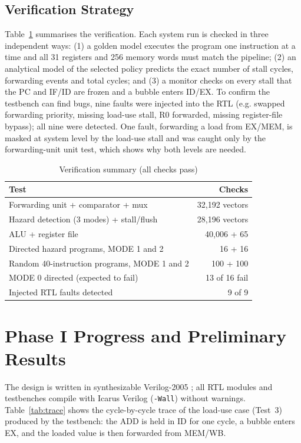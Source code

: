 \documentclass[conference]{IEEEtran}
\begin{document}
\subsection{Verification Strategy}
Table~\ref{tab:verif} summarises the verification. Each system run is checked in three independent ways: (1) a golden model executes the program one instruction at a time and all 31 registers and 256 memory words must match the pipeline; (2) an analytical model of the selected policy predicts the exact number of stall cycles, forwarding events and total cycles; and (3) a monitor checks on every stall that the PC and IF/ID are frozen and a bubble enters ID/EX. To confirm the testbench can find bugs, nine faults were injected into the RTL (e.g. swapped forwarding priority, missing load-use stall, R0 forwarded, missing register-file bypass); all nine were detected. One fault, forwarding a load from EX/MEM, is masked at system level by the load-use stall and was caught only by the forwarding-unit unit test, which shows why both levels are needed.

\begin{table}[t]
\caption{Verification summary (all checks pass)}
\label{tab:verif}
\centering
\begin{tabular}{@{}lr@{}}
\toprule
Test & Checks \\
\midrule
Forwarding unit + comparator + mux & 32{,}192 vectors \\
Hazard detection (3 modes) + stall/flush & 28{,}196 vectors \\
ALU + register file & 40{,}006 + 65 \\
Directed hazard programs, MODE 1 and 2 & 16 + 16 \\
Random 40-instruction programs, MODE 1 and 2 & 100 + 100 \\
MODE 0 directed (expected to fail) & 13 of 16 fail \\
Injected RTL faults detected & 9 of 9 \\
\bottomrule
\end{tabular}
\end{table}

\section{Phase I Progress and Preliminary Results}
The design is written in synthesizable Verilog-2005 \cite{ieee1364}; all RTL modules and testbenches compile with Icarus Verilog \cite{icarus} (\texttt{-Wall}) without warnings. Table~\ref{tab:trace} shows the cycle-by-cycle trace of the load-use case (Test~3) produced by the testbench: the ADD is held in ID for one cycle, a bubble enters EX, and the loaded value is then forwarded from MEM/WB.
\end{document}

